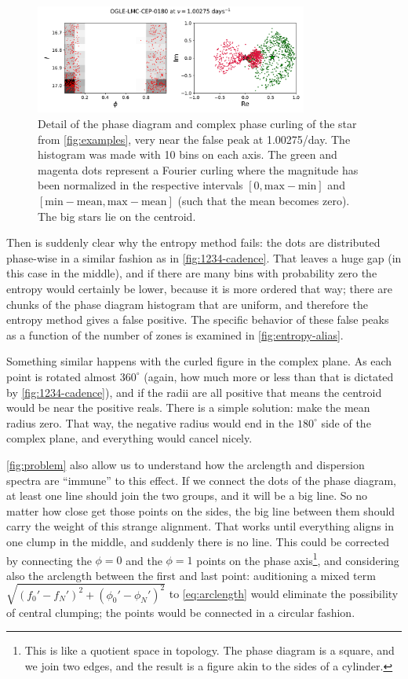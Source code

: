 \begin{figure}
	\centering
	\includegraphics[width=0.8\textwidth]{img/alias.pdf}
	\caption[Detail of the failure mode of Fourier and entropy methods]{
		Detail of the phase diagram and complex phase curling of the star from \autoref{fig:examples}, very near the false peak at 1.00275/day.
		The histogram was made with 10 bins on each axis.
		The green and magenta dots represent a Fourier curling where the magnitude has been normalized in the respective intervals 
		$[0,\text{max}-\text{min}]$ and $[\text{min}-\text{mean},\text{max}-\text{mean}]$ (such that the mean becomes zero).
		The big stars lie on the centroid.
	}
	\label{fig:problem}
\end{figure}

Then is suddenly clear why the entropy method fails: the dots are distributed phase-wise in a similar fashion as in \autoref{fig:1234-cadence}.
That leaves a huge gap (in this case in the middle), and if there are many bins with probability zero the entropy would certainly be lower,
because it is more ordered that way; there are chunks of the phase diagram histogram that are uniform, and therefore the entropy method gives a false positive.
The specific behavior of these false peaks as a function of the number of zones is examined in \autoref{fig:entropy-alias}.

Something similar happens with the curled figure in the complex plane. As each point is rotated almost $360^\circ$ 
(again, how much more or less than that is dictated by \autoref{fig:1234-cadence}), and if the radii are all positive that means the centroid would be near the positive reals.
There is a simple solution: make the mean radius zero. That way, the negative radius would end in the $180^\circ$ side of the complex plane, and everything would cancel nicely.

\autoref{fig:problem} also allow us to understand how the arclength and dispersion spectra are \enquote{immune} to this effect. 
If we connect the dots of the phase diagram,  at least one line should join the two groups, and it will be a big line.
So no matter how close get those points on the sides, the big line between them should carry the weight of this strange alignment.
That works until everything aligns in one clump in the middle, and suddenly there is no line.
This could be corrected by connecting the $\phi=0$ and the $\phi=1$ points on the phase axis\footnote{
	This is like a quotient space in topology. The phase diagram is a square, and we join two edges, 
	and the result is a figure akin to the sides of a cylinder.
}, and considering also the arclength between the first and last point: 
auditioning a mixed term $\sqrt{(f_0'-f_N')^2+(\phi_0'-\phi_N')^2}$ to \autoref{eq:arclength}
would eliminate the possibility of central clumping; the points would be connected in a circular fashion.

